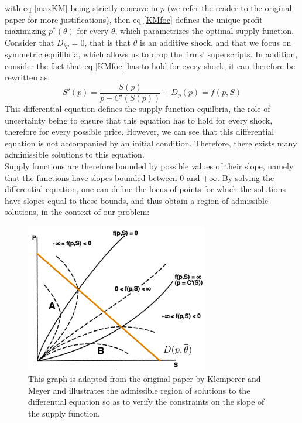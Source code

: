 with eq \ref{maxKM} being strictly concave in $p$ (we refer the reader to the original paper for more justifications), then eq \ref{KMfoc} defines the unique profit maximizing $p^*(\theta)$ for every $\theta$, which parametrizes the optimal supply function. \\

Consider that $D_{\theta p }=0$, that is that $\theta$ is an additive shock, and that we focus on symmetric equilibria, which allows us to drop the firms' superscripts. In addition, consider the fact that eq \ref{KMfoc} has to hold for every shock, it can therefore be rewritten as:
\begin{equation}\label{KMdiff}
S'(p) = \frac{S(p)}{p-C'(S(p))} + D_p(p)= f(p,S)
\end{equation}
This differential equation defines the supply function equilbria, the role of uncertainty being to ensure that this equation has to hold for every shock, therefore for every possible price. However, we can see that this differential equation is not accompanied by an initial condition. Therefore, there exists many adminissible solutions to this equation.\\

Supply functions are therefore bounded by possible values of their slope, namely that the functions have slopes bounded between $0$ and $+\infty$. By solving the differential equation, one can define the locus of points for which the solutions have slopes equal to these bounds, and thus obtain a region of admissible solutions, in the context of our problem:

\begin{figure}[h]
\centering
\includegraphics[width=8cm]{figintro/KMboundaries.png}
\caption{\small{This graph is adapted from the original paper by Klemperer and Meyer and illustrates the admissible region of solutions to the differential equation so as to verify the constraints on the slope of the supply function.}}
\label{KMboundaries}
\end{figure}

